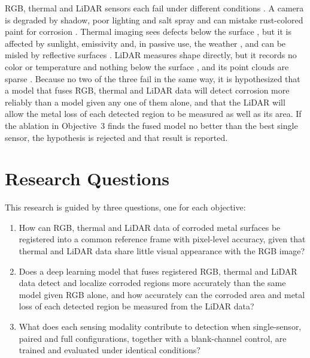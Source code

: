RGB, thermal and LiDAR sensors each fail under different conditions
\citep{Tran2024}. A camera is degraded by shadow, poor lighting and salt spray
\citep{Soares2023,Mao2026,Espinoza2026} and can mistake rust-colored paint
for corrosion \citep{Espinoza2026,Lavadiya2022}. Thermal imaging sees defects
below the surface
\citep{Elizalde2023,Doshvarpassand2022,Hernndez-Surez2026}, but it is affected
by sunlight, emissivity and, in passive use, the weather
\citep{Elizalde2023,Egodawela2025}, and can be misled by reflective surfaces
\citep{Tran2024}. LiDAR measures shape directly, but it records no color or
temperature and nothing below the surface \citep{Ding2025}, and its point
clouds are sparse \citep{Tran2024}. Because no two of the three fail in the
same way, it is hypothesized that a model that fuses RGB, thermal and LiDAR
data will detect corrosion more reliably than a model given any one of them
alone, and that the LiDAR will allow the metal loss of each detected region to
be measured as well as its area. If the ablation in Objective~3 finds the
fused model no better than the best single sensor, the hypothesis is rejected
and that result is reported.

\section{Research Questions}
\label{sec:research-questions}

This research is guided by three questions, one for each objective:

\begin{enumerate}[label=RQ\arabic*.,leftmargin=*,itemsep=8pt]
  \item How can RGB, thermal and LiDAR data of corroded metal surfaces be
        registered into a common reference frame with pixel-level accuracy,
        given that thermal and LiDAR data share little visual appearance with
        the RGB image?
  \item Does a deep learning model that fuses registered RGB, thermal and
        LiDAR data detect and localize corroded regions more accurately than
        the same model given RGB alone, and how accurately can the corroded
        area and metal loss of each detected region be measured from the LiDAR
        data?
  \item What does each sensing modality contribute to detection when
        single-sensor, paired and full configurations, together with a
        blank-channel control, are trained and evaluated under identical
        conditions?
\end{enumerate}

